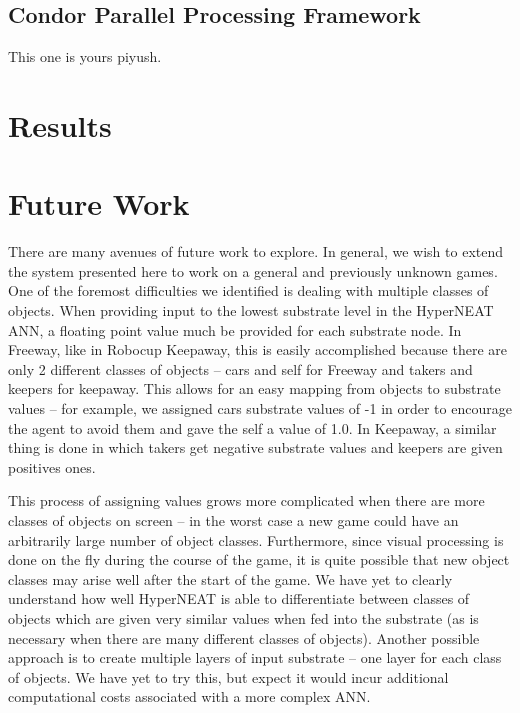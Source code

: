 \documentclass{article}
\begin{document}
\subsection{Condor Parallel Processing Framework}
This one is yours piyush.

\section{Results}

\section{Future Work}
There are many avenues of future work to explore. In general, we wish to extend the system presented here to work on a general and previously unknown games. One of the foremost difficulties we identified is dealing with multiple classes of objects. When providing input to the lowest substrate level in the HyperNEAT ANN, a floating point value much be provided for each substrate node. In Freeway, like in Robocup Keepaway, this is easily accomplished because there are only 2 different classes of objects -- cars and self for Freeway and takers and keepers for keepaway. This allows for an easy mapping from objects to substrate values -- for example, we assigned cars substrate values of -1 in order to encourage the agent to avoid them and gave the self a value of 1.0. In Keepaway, a similar thing is done in which takers get negative substrate values and keepers are given positives ones. 

This process of assigning values grows more complicated when there are more classes of objects on screen -- in the worst case a new game could have an arbitrarily large number of object classes. Furthermore, since visual processing is done on the fly during the course of the game, it is quite possible that new object classes may arise well after the start of the game. We have yet to clearly understand how well HyperNEAT is able to differentiate between classes of objects which are given very similar values when fed into the substrate (as is necessary when there are many different classes of objects). Another possible approach is to create multiple layers of input substrate -- one layer for each class of objects. We have yet to try this, but expect it would incur additional computational costs associated with a more complex ANN.
\end{document}
